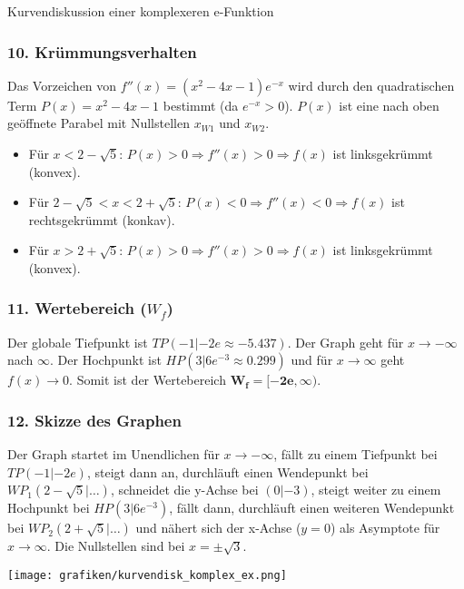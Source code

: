 \begin{loesungsumgebung}{Kurvendiskussion einer komplexeren e-Funktion}
\subsubsection*{10. Krümmungsverhalten}
Das Vorzeichen von $f''(x) = (x^2 - 4x - 1)e^{-x}$ wird durch den quadratischen Term $P(x)=x^2-4x-1$ bestimmt (da $e^{-x}>0$). $P(x)$ ist eine nach oben geöffnete Parabel mit Nullstellen $x_{W1}$ und $x_{W2}$.
\begin{itemize}
    \item Für $x < 2-\sqrt{5}$: $P(x) > 0 \Rightarrow f''(x) > 0 \Rightarrow f(x)$ ist linksgekrümmt (konvex).
    \item Für $2-\sqrt{5} < x < 2+\sqrt{5}$: $P(x) < 0 \Rightarrow f''(x) < 0 \Rightarrow f(x)$ ist rechtsgekrümmt (konkav).
    \item Für $x > 2+\sqrt{5}$: $P(x) > 0 \Rightarrow f''(x) > 0 \Rightarrow f(x)$ ist linksgekrümmt (konvex).
\end{itemize}

\subsubsection*{11. Wertebereich ($W_f$)}
Der globale Tiefpunkt ist $TP(-1|-2e \approx -5.437)$. Der Graph geht für $x \to -\infty$ nach $\infty$. Der Hochpunkt ist $HP(3|6e^{-3} \approx 0.299)$ und für $x \to \infty$ geht $f(x) \to 0$.
Somit ist der Wertebereich $\mathbf{W_f = [-2e, \infty)}$.

\subsubsection*{12. Skizze des Graphen}
Der Graph startet im Unendlichen für $x \to -\infty$, fällt zu einem Tiefpunkt bei $TP(-1|-2e)$, steigt dann an, durchläuft einen Wendepunkt bei $WP_1(2-\sqrt{5}| \dots)$, schneidet die y-Achse bei $(0|-3)$, steigt weiter zu einem Hochpunkt bei $HP(3|6e^{-3})$, fällt dann, durchläuft einen weiteren Wendepunkt bei $WP_2(2+\sqrt{5}| \dots)$ und nähert sich der x-Achse ($y=0$) als Asymptote für $x \to \infty$. Die Nullstellen sind bei $x=\pm\sqrt{3}$.
\begin{center}
\texttt{[image: grafiken/kurvendisk\_komplex\_ex.png]}
\label{fig:kurvendisk_komplex_ex}
\end{center}

\end{loesungsumgebung}


